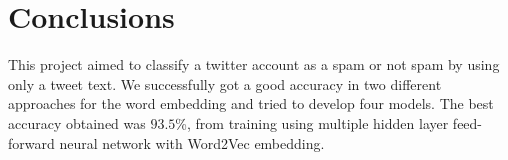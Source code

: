 \section{Conclusions}
This project aimed to classify a twitter account as a spam or not spam by using only a tweet text. We successfully got a good accuracy in two different approaches for the word embedding and tried to develop four models. The best accuracy obtained was $93.5$\%, from training using multiple hidden layer feed-forward neural network with Word2Vec embedding. 
\label{sec:conclusions}